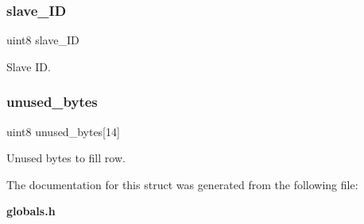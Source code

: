 \subsubsection{slave\+\_\+\+ID}
{\footnotesize\ttfamily uint8 slave\+\_\+\+ID}

Slave ID. \mbox{\label{structst___m_a_s_t_e_r__spec_a0f6c854c7d0c8714d1e1f9acbf105362}} 
\subsubsection{unused\+\_\+bytes}
{\footnotesize\ttfamily uint8 unused\+\_\+bytes[14]}

Unused bytes to fill row. 

The documentation for this struct was generated from the following file\+:\begin{DoxyCompactItemize}
\item 
\textbf{ globals.\+h}\end{DoxyCompactItemize}
